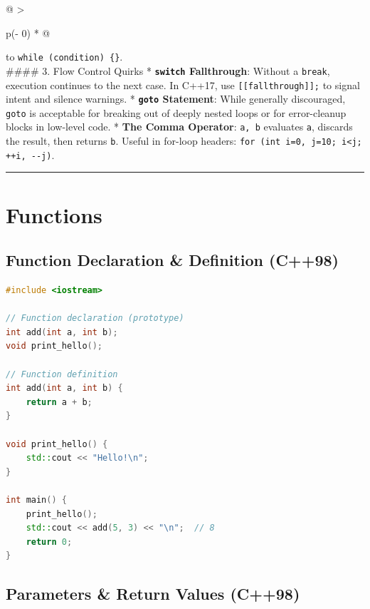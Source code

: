 \begin{longtable}[]{@{}
  >{\raggedright\arraybackslash}p{(\columnwidth - 0\tabcolsep) * }@{}}
to \passthrough{\lstinline!while (condition) \{\}!}. \\
\#\#\#\# 3. Flow Control Quirks *
\textbf{\passthrough{\lstinline!switch!} Fallthrough}: Without a
\passthrough{\lstinline!break!}, execution continues to the next case.
In C++17, use \passthrough{\lstinline![[fallthrough]];!} to signal
intent and silence warnings. * \textbf{\passthrough{\lstinline!goto!}
Statement}: While generally discouraged, \passthrough{\lstinline!goto!}
is acceptable for breaking out of deeply nested loops or for
error-cleanup blocks in low-level code. * \textbf{The Comma Operator}:
\passthrough{\lstinline!a, b!} evaluates \passthrough{\lstinline!a!},
discards the result, then returns \passthrough{\lstinline!b!}. Useful in
for-loop headers:
\passthrough{\lstinline!for (int i=0, j=10; i<j; ++i, --j)!}. \\
\bottomrule
\end{longtable}

\begin{center}\rule{0.5\linewidth}{0.5pt}\end{center}

\hypertarget{functions}{%
\section{Functions}\label{functions}}

\hypertarget{function-declaration-definition-c98}{%
\subsection{Function Declaration \& Definition
(C++98)}\label{function-declaration-definition-c98}}

\begin{lstlisting}[language={C++}]
#include <iostream>

// Function declaration (prototype)
int add(int a, int b);
void print_hello();

// Function definition
int add(int a, int b) {
    return a + b;
}

void print_hello() {
    std::cout << "Hello!\n";
}

int main() {
    print_hello();
    std::cout << add(5, 3) << "\n";  // 8
    return 0;
}
\end{lstlisting}

\hypertarget{parameters-return-values-c98}{%
\subsection{Parameters \& Return Values
(C++98)}\label{parameters-return-values-c98}}

